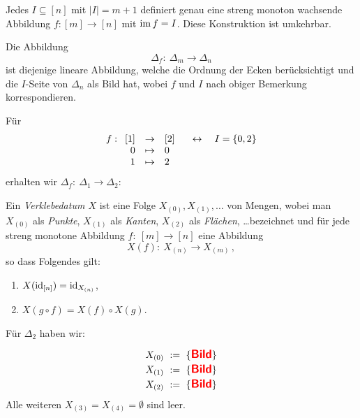 \begin{bemerkung}
  Jedes $I\subseteq [n]$ mit $|I| = m+1$ definiert genau eine streng monoton
  wachsende Abbildung 
  $f: [m]  \to  [n]$ mit $\operatorname{im} f = I$.
  Diese Konstruktion ist umkehrbar.
\end{bemerkung}

\begin{definition}
  Die Abbildung 
  \[ \Delta_f:\ \Delta_m \to \Delta_n\]
  ist diejenige lineare Abbildung, welche die Ordnung der Ecken berücksichtigt
  und die $I$-Seite von $\Delta_n$ als Bild hat, wobei $f$ und $I$ nach obiger
  Bemerkung korrespondieren.
\end{definition}

\begin{beispiel}
  Für 
  \[ f: \funcdef{[1]& \to &[2] \\ 0 &\mapsto& 0\\ 1&\mapsto&2}
    \quad\leftrightarrow\quad I = \{0,2\}\]
  erhalten wir $\Delta_f:\ \Delta_1\to\Delta_2$: \Bild
\end{beispiel}


\begin{definition}
  Ein \emph{Verklebedatum $X$} ist eine Folge 
  $X_{(0)}, X_{(1)}, \ldots$ von Mengen,
  wobei man $X_{(0)}$ als \emph{Punkte}, $X_{(1)}$ als \emph{Kanten}, 
  $X_{(2)}$ als \emph{Flächen}, \ldots bezeichnet und für jede streng 
  monotone Abbildung $f:\ [m]\to[n]$ eine Abbildung
  \[ X(f):\ X_{(n)} \to X_{(m)}\,,\]
  so dass Folgendes gilt:
  \begin{enumerate}
    \item $X(\operatorname{id}_{[n]}) = \operatorname{id}_{X_{(n)}}$,
    \item $X(g\circ f) = X(f)\circ X(g)$.
  \end{enumerate}
\end{definition}

\begin{beispiel}
  \label{bsp:2-simplex-x}
  Für $\Delta_2$ haben wir:
  \begin{center}
    \begin{minipage}{0.4\textwidth}
      \Bild
      \centering
    \end{minipage}
    \hfill
    \begin{minipage}{0.4\textwidth}
      \begin{align*}
        X_{(0)} \ :=\  \{ \text{\sffamily\bfseries\large \color{red} Bild}\}\\
        X_{(1)} \ :=\  \{ \text{\sffamily\bfseries\large \color{red} Bild}\}\\
        X_{(2)} \ :=\  \{ \text{\sffamily\bfseries\large \color{red} Bild}\}
        \end{align*}
      Alle weiteren $X_{(3)} = X_{(4)} = \emptyset$ sind leer.
    \end{minipage}
  \end{center}
\end{beispiel}


